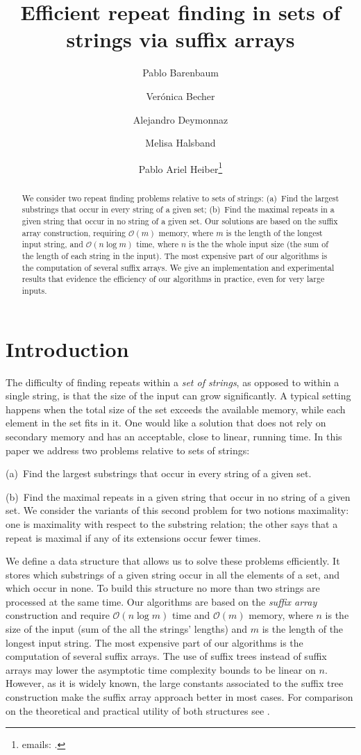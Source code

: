 \documentclass[submission]{dmtcs}
\author[Barenbaum\and Becher\and Deymonnaz\and Halsband\and Heiber]{Pablo Barenbaum\addressmark{1}\and Ver\'onica Becher\addressmark{1,2}\and Alejandro Deymonnaz\addressmark{1}\and Melisa Halsband\addressmark{1}\and Pablo Ariel Heiber\addressmark{1,2}\thanks{emails: \email{\{pbarenbaum,vbecher,adeymo,mhalsband,pheiber\}@dc.uba.ar}.}}
\title[Efficient repeat finding in sets of strings via suffix arrays]{Efficient repeat finding in sets of strings via suffix arrays}
\newcommand{\Ode}{{\mathcal O}}
\newcommand\+[1]{\mathcal{#1}}
\begin{document}
\maketitle

\begin{abstract}
\noindent
We consider two repeat finding problems relative to sets of strings:
(a)\ Find the largest substrings that occur in every string of a given set; 
(b)\ Find the maximal repeats in a given string that occur in no string of a given set.
Our solutions are based on the suffix array construction, requiring $\mathcal{O}(m)$ memory, where $m$ is the length of the longest input string, and $\mathcal{O}(n \log m)$ time, where $n$ is the the whole input size (the sum of the length of each  string in the input).
The most expensive part of our algorithms is the computation  
of several suffix arrays.
We give an implementation and experimental results
that evidence the efficiency of our algorithms in practice,
even for very large inputs.
\end{abstract}

\section{Introduction}

The difficulty of  finding repeats within a {\em set of strings}, as opposed to 
within a single  string,  is that the size of the input can grow significantly. 
A typical setting happens when the total size of the set exceeds the available memory, 
while each element in the set fits in it.
One would like a solution that does not rely on secondary memory
and has an acceptable, close to linear, running time.
In this paper we address two problems relative to sets of strings:

(a)\ Find the largest substrings that occur in every string of a given set.

(b)\ Find the maximal repeats in a given string that  occur in no string of a given set.
We consider the variants of this second problem for two notions maximality: 
one is maximality with respect to the substring relation;
the other says that a repeat is maximal if any of its extensions occur fewer times. 

We define a data structure that allows us to solve these problems efficiently.
It stores which substrings of a given string occur in all the elements of a set, 
and which occur in none.
To build this structure no more than two strings are processed at the same time.
Our algorithms are based on the {\em suffix array} construction \cite{manber93}
and require $\Ode(n \log m)$ time and $\Ode(m)$ memory, where
$n$ is the size of the input (sum of the all the strings' lengths) 
and $m$ is the length of the longest input string.
The most expensive part of our algorithms is the computation of several suffix arrays.
The use of suffix trees instead of suffix arrays
may lower the asymptotic time complexity bounds to be linear on $n$.
However, as it is widely known,
the large constants associated to the 
suffix tree construction make the suffix array approach 
better in most cases. For comparison on the theoretical and practical utility
of both structures see \cite{abouelhoda,puglisi}.
\end{document}
